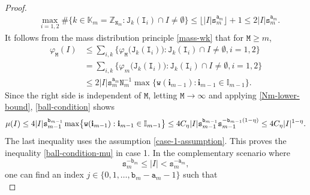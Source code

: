 \documentclass[12pt, twoside]{article}
\theoremstyle{definition}
\numberwithin{equation}{section}
\begin{document}
\begin{proof}
\begin{align*}
		&\max_{i=1,2}\#\bigl\{k \in \mathbb K_m = \mathbb Z_{\mathtt N_m}: \mathtt J_k(\mathtt I_i) \cap I \ne \emptyset \bigr\} \leq \lfloor |I| \mathtt s_m^{\mathtt a_m} \rfloor + 1 \leq 2 |I| \mathtt s_m^{\mathtt a_m}. 
	\end{align*}  It follows from the mass distribution principle \eqref{mass-wk} that for $\mathtt M \geq m$, 
	\begin{align*} \varphi_{\mathtt M}(I) &\leq \sum_{i, k} \bigl\{\varphi_{\mathtt M}\bigl(\mathtt J_k(\mathtt I_i) \bigr): \mathtt J_k(\mathtt I_i) \cap I \neq \emptyset, i = 1, 2  \bigr\} \\ &= \sum_{i, k} \bigl\{\varphi_{m}\bigl(\mathtt J_k(\mathtt I_i) \bigr): \mathtt J_k(\mathtt I_i) \cap I \neq \emptyset, i=1, 2  \bigr\}  \\ &\leq 2 |I| \mathtt s_m^{\mathtt a_m} \mathtt N_m^{-1} \max \bigl\{ \mathtt w(\mathbf i_{m-1}) : \mathbf i_{m-1} \in \mathbb I_{m-1} \bigr\}.
	\end{align*} 
	Since the right side is independent of $\mathtt M$, letting $\mathtt M \rightarrow \infty$ and applying \eqref{Nm-lower-bound}, \eqref{ball-condition} shows
	\[
	\mu(I) \leq 4|I| \mathtt s_{m-1}^{\mathtt b_{m-1}} \max \bigl\{ \mathtt w(\mathbf i_{m-1}) : \mathbf i_{m-1} \in \mathbb I_{m-1} \bigr\} \leq 4C_{\eta}|I| \mathtt s_{m-1}^{\mathtt b_{m-1}} \mathtt s_{m-1}^{- \mathtt b_{m-1}(1- \eta)} \\ 
	\leq 4 C_{\eta} |I|^{1 - \eta}.  
	\]
	The last inequality uses the assumption \eqref{case-1-assumption}. This proves the inequality \eqref{ball-condition-mu} in case 1. 
	\vskip0.1in
	 In the complementary scenario where 
	\begin{equation} 
		\mathtt s_m^{-\mathtt b_m} \leq |I| < \mathtt s_{m}^{-\mathtt a_{m}},
		\label{case-2-assumption} 
	\end{equation} 
	one can find an index $j \in \{0, 1, \ldots, \mathtt b_m - \mathtt a_m - 1\}$ such that
	\begin{equation} \label{case-2-assumption-plus}

\end{equation}
\end{proof}
\end{document}
